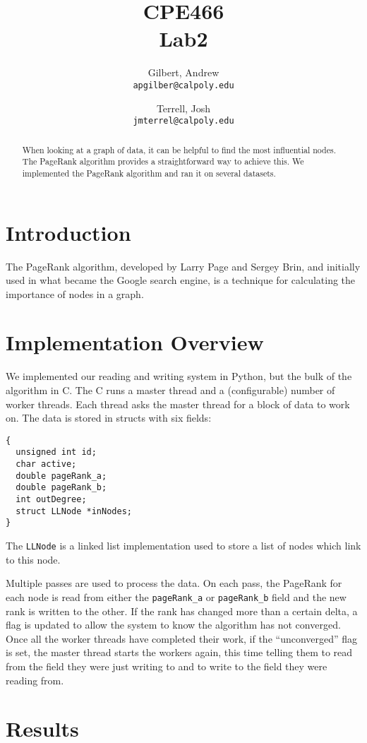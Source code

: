 \documentclass{report}
\title{CPE466\\Lab2}
\author{
  Gilbert, Andrew\\
  \texttt{apgilber@calpoly.edu}
  \and
  Terrell, Josh\\
  \texttt{jmterrel@calpoly.edu}
}
\date{}
\begin{document}
\maketitle

\begin{abstract}
  When looking at a graph of data, it can be helpful to find the most
influential nodes. The PageRank algorithm provides a straightforward
way to achieve this. We implemented the PageRank algorithm and ran it
on several datasets.
\end{abstract}

\section{Introduction}
The PageRank algorithm, developed by Larry Page and Sergey Brin, and
initially used in what became the Google search engine, is a technique
for calculating the importance of nodes in a graph.



\section{Implementation Overview}
We implemented our reading and writing system in Python, but the bulk
of the algorithm in C. The C runs a master thread and a (configurable)
number of worker threads. Each thread asks the master thread for a
block of data to work on. The data is stored in structs with six
fields:
\begin{lstlisting}[lang=ANSI]
{
  unsigned int id;
  char active;
  double pageRank_a;
  double pageRank_b;
  int outDegree;
  struct LLNode *inNodes;
}
\end{lstlisting}
The \texttt{LLNode} is a linked list implementation used to store a list of nodes which link to this node.

Multiple passes are used to process the data. On each pass, the
PageRank for each node is read from either the \texttt{pageRank_a} or
\texttt{pageRank_b} field and the new rank is written to the other. If the
rank has changed more than a certain delta, 
a flag is updated to allow
the system to know the algorithm has not converged. Once all the
worker threads have completed their work, if the ``unconverged'' flag
is set, the master thread starts the workers again, this time telling
them to read from the field they were just writing to and to write to
the field they were reading from.

\section{Results}
\end{document}
